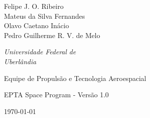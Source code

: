 \begin{titlepage}
\begin{minipage}[h!]{0.6\textwidth}
		\vspace{0.8\baselineskip} %
		
        {
        Felipe J. O. Ribeiro \\ 
        Mateus da Silva Fernandes \\ 
        Olavo Caetano Inácio \\
        Pedro Guilherme R. V. de Melo
        } %
        
		
        \vspace{0.8\baselineskip} %
	
		\textit{Universidade Federal de \\ Uberlândia} %
	
		\vspace{12.8\baselineskip} %
	
		{\large Equipe de Propulsão e Tecnologia Aeroespacial} %
		
		\vspace{0.3\baselineskip} %
		
		EPTA Space Program - Versão 1.0 %
		
		\vspace{0.3\baselineskip} %
		
		\today %
		
	\end{minipage}



\end{titlepage}

